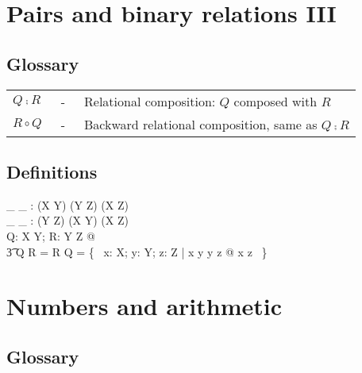 \documentclass{article}
\begin{document}
\newpage

\section*{Pairs and binary relations III}

\subsection*{Glossary}

\begin{tabular}{l c l}
$Q \comp R$ & ~-~ & Relational composition: $Q$ composed with $R$ \\
$R \circ Q$ & ~-~ & Backward relational composition, same as $Q \comp R$ \\
\end{tabular}

\subsection*{Definitions}

\begin{gendef}[X,Y,Z]
	\_ \comp \_ : (X \rel Y) \cross (Y \rel Z) \fun (X \rel Z) \\
	\_ \circ \_ : (Y \rel Z) \cross (X \rel Y) \fun (X \rel Z) \\
\where
	\forall Q: X \rel Y; R: Y \rel Z @ \\
\t3		Q \comp R = R \circ Q = \{~ x: X; y: Y; z: Z | x  y \land y  z @ x \mapsto z ~\}
\end{gendef}

\newpage

\section*{Numbers and arithmetic}

\subsection*{Glossary}
\end{document}
